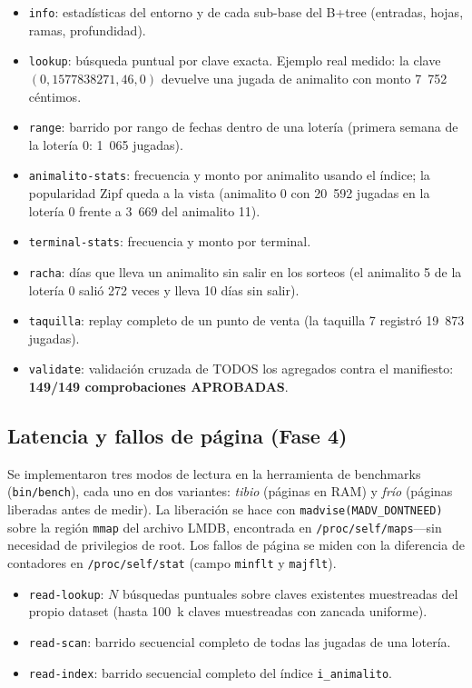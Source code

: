 \documentclass[12pt, letterpaper]{article}
\begin{document}
\begin{itemize}
    \item \texttt{info}: estadísticas del entorno y de cada sub-base del
    B+tree (entradas, hojas, ramas, profundidad).
    \item \texttt{lookup}: búsqueda puntual por clave exacta. Ejemplo real
    medido: la clave $(0, 1577838271, 46, 0)$ devuelve una jugada de
    animalito con monto 7~752 céntimos.
    \item \texttt{range}: barrido por rango de fechas dentro de una lotería
    (primera semana de la lotería 0: 1~065 jugadas).
    \item \texttt{animalito-stats}: frecuencia y monto por animalito usando
    el índice; la popularidad Zipf queda a la vista (animalito 0 con 20~592
    jugadas en la lotería 0 frente a 3~669 del animalito 11).
    \item \texttt{terminal-stats}: frecuencia y monto por terminal.
    \item \texttt{racha}: días que lleva un animalito sin salir en los
    sorteos (el animalito 5 de la lotería 0 salió 272 veces y lleva 10 días
    sin salir).
    \item \texttt{taquilla}: replay completo de un punto de venta (la
    taquilla 7 registró 19~873 jugadas).
    \item \texttt{validate}: validación cruzada de TODOS los agregados
    contra el manifiesto: \textbf{149/149 comprobaciones APROBADAS}.
\end{itemize}

\subsection{Latencia y fallos de página (Fase 4)}

Se implementaron tres modos de lectura en la herramienta de benchmarks
(\texttt{bin/bench}), cada uno en dos variantes: \emph{tibio} (páginas en
RAM) y \emph{frío} (páginas liberadas antes de medir). La liberación se
hace con \texttt{madvise(MADV\_DONTNEED)} sobre la región \texttt{mmap} del
archivo LMDB, encontrada en \texttt{/proc/self/maps}---sin necesidad de
privilegios de root. Los fallos de página se miden con la diferencia de
contadores en \texttt{/proc/self/stat} (campo \texttt{minflt} y
\texttt{majflt}).

\begin{itemize}
    \item \texttt{read-lookup}: $N$ búsquedas puntuales sobre claves
    existentes muestreadas del propio dataset (hasta 100~k claves
    muestreadas con zancada uniforme).
    \item \texttt{read-scan}: barrido secuencial completo de todas las
    jugadas de una lotería.
    \item \texttt{read-index}: barrido secuencial completo del índice
    \texttt{i\_animalito}.
\end{itemize}
\end{document}
